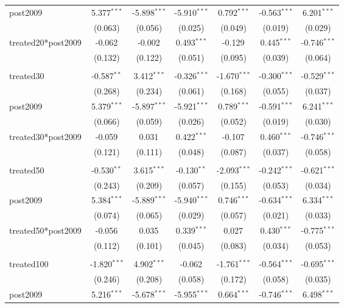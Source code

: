 \documentclass[12pt]{article}
\begin{document}
\begin{table}[!htbp]
\begin{tabular}{@{\extracolsep{5pt}}lcccccc}
 post2009 & 5.377$^{***}$ & -5.898$^{***}$ & -5.910$^{***}$ & 0.792$^{***}$ & -0.563$^{***}$ & 6.201$^{***}$ \\
  & (0.063) & (0.056) & (0.025) & (0.049) & (0.019) & (0.029) \\
 treated20*post2009 & -0.062$^{}$ & -0.002$^{}$ & 0.493$^{***}$ & -0.129$^{}$ & 0.445$^{***}$ & -0.746$^{***}$ \\
  & (0.132) & (0.122) & (0.051) & (0.095) & (0.039) & (0.064) \\
\hline \\[-1.8ex]
 treated30 & -0.587$^{**}$ & 3.412$^{***}$ & -0.326$^{***}$ & -1.670$^{***}$ & -0.300$^{***}$ & -0.529$^{***}$ \\
  & (0.268) & (0.234) & (0.061) & (0.168) & (0.055) & (0.037) \\
 post2009 & 5.379$^{***}$ & -5.897$^{***}$ & -5.921$^{***}$ & 0.789$^{***}$ & -0.591$^{***}$ & 6.241$^{***}$ \\
  & (0.066) & (0.059) & (0.026) & (0.052) & (0.019) & (0.030) \\
 treated30*post2009 & -0.059$^{}$ & 0.031$^{}$ & 0.422$^{***}$ & -0.107$^{}$ & 0.460$^{***}$ & -0.746$^{***}$ \\
  & (0.121) & (0.111) & (0.048) & (0.087) & (0.037) & (0.058) \\
\hline \\[-1.8ex]
 treated50 & -0.530$^{**}$ & 3.615$^{***}$ & -0.130$^{**}$ & -2.093$^{***}$ & -0.242$^{***}$ & -0.621$^{***}$ \\
  & (0.243) & (0.209) & (0.057) & (0.155) & (0.053) & (0.034) \\
 post2009 & 5.384$^{***}$ & -5.889$^{***}$ & -5.940$^{***}$ & 0.746$^{***}$ & -0.634$^{***}$ & 6.334$^{***}$ \\
  & (0.074) & (0.065) & (0.029) & (0.057) & (0.021) & (0.033) \\
 treated50*post2009 & -0.056$^{}$ & 0.035$^{}$ & 0.339$^{***}$ & 0.027$^{}$ & 0.430$^{***}$ & -0.775$^{***}$ \\
  & (0.112) & (0.101) & (0.045) & (0.083) & (0.034) & (0.053) \\
\hline \\[-1.8ex]
 treated100 & -1.820$^{***}$ & 4.902$^{***}$ & -0.062$^{}$ & -1.761$^{***}$ & -0.564$^{***}$ & -0.695$^{***}$ \\
  & (0.246) & (0.208) & (0.058) & (0.172) & (0.058) & (0.035) \\
 post2009 & 5.216$^{***}$ & -5.678$^{***}$ & -5.955$^{***}$ & 0.664$^{***}$ & -0.746$^{***}$ & 6.498$^{***}$ \\

\end{tabular}
\end{table}
\end{document}
